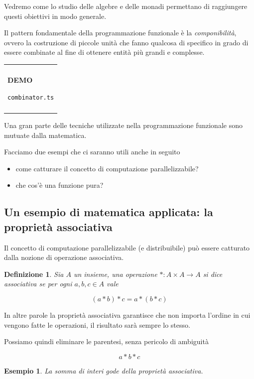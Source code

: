 \documentclass[12pt]{article}
\newtheorem{definition}{Definizione}
\newtheorem{example}{Esempio}
\newenvironment{demo}
    {\begin{center}
    \begin{tabular}{|p{0.9\textwidth}|}
    \hline\\
    }
    {
    \\\\\hline
    \end{tabular}
    \end{center}
    }
\begin{document}
Vedremo come lo studio delle algebre e delle monadi permettano di raggiungere questi obiettivi in modo generale.

Il pattern fondamentale della programmazione funzionale è la \emph{componibilità}, ovvero la costruzione di piccole unità
che fanno qualcosa di specifico in grado di essere combinate al fine di ottenere entità più grandi e complesse.

\begin{demo}
\begin{center}
\textbf{DEMO}

\texttt{combinator.ts}
\end{center}
\end{demo}

Una gran parte delle tecniche utilizzate nella programmazione funzionale sono mutuate dalla matematica.

Facciamo due esempi che ci saranno utili anche in seguito

\begin{itemize}
  \item come catturare il concetto di computazione parallelizzabile?
  \item che cos'è una funzione pura?
\end{itemize}

\subsection{Un esempio di matematica applicata: la proprietà associativa}

Il concetto di computazione parallelizzabile (e distribuibile) può essere catturato dalla nozione di operazione associativa.

\begin{definition}
Sia $A$ un insieme, una operazione $*: A \times A \rightarrow A$ si dice \emph{associativa} se per ogni $a, b, c \in A$ vale

$$
(a * b) * c = a * ( b * c )
$$
\end{definition}

In altre parole la proprietà associativa garantisce che non importa l'ordine in cui vengono fatte le operazioni, il risultato sarà sempre lo stesso.

Possiamo quindi eliminare le parentesi, senza pericolo di ambiguità

$$
a * b * c
$$

\begin{example}
La somma di interi gode della proprietà associativa.
\end{example}
\end{document}
